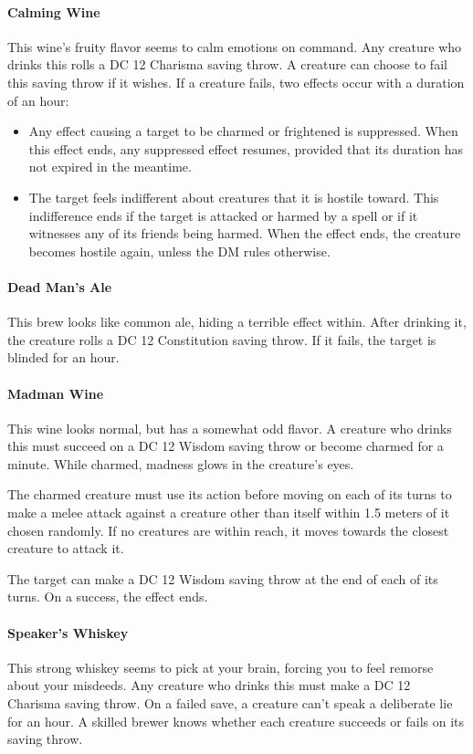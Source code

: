 \paragraph{Calming Wine} %
    This wine's fruity flavor seems to calm emotions on command.
    Any creature who drinks this rolls a DC 12 Charisma saving throw.
    A creature can choose to fail this saving throw if it wishes.
    If a creature fails, two effects occur with a duration of an hour:
    \begin{itemize}
        \item Any effect causing a target to be charmed or frightened is suppressed.
        When this effect ends, any suppressed effect resumes, provided that its duration has not expired in the meantime.
        \item The target feels indifferent about creatures that it is hostile toward.
        This indifference ends if the target is attacked or harmed by a spell or if it witnesses any of its friends being harmed.
        When the effect ends, the creature becomes hostile again, unless the DM rules otherwise.
    \end{itemize}
\paragraph{Dead Man's Ale} %
    This brew looks like common ale, hiding a terrible effect within.
    After drinking it, the creature rolls a DC 12 Constitution saving throw.
    If it fails, the target is blinded for an hour.
\paragraph{Madman Wine} %
    This wine looks normal, but has a somewhat odd flavor.
    A creature who drinks this must succeed on a DC 12 Wisdom saving throw or become charmed for a minute.
    While charmed, madness glows in the creature's eyes.

    The charmed creature must use its action before moving on each of its turns to make a melee attack against a creature other than itself within 1.5 meters of it chosen randomly.
    If no creatures are within reach, it moves towards the closest creature to attack it.

    The target can make a DC 12 Wisdom saving throw at the end of each of its turns.
    On a success, the effect ends.
\paragraph{Speaker's Whiskey} %
    This strong whiskey seems to pick at your brain, forcing you to feel remorse about your misdeeds.
    Any creature who drinks this must make a DC 12 Charisma saving throw.
    On a failed save, a creature can't speak a deliberate lie for an hour.
    A skilled brewer knows whether each creature succeeds or fails on its saving throw.


